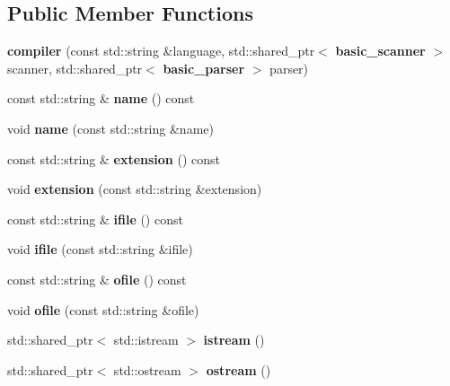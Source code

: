 \subsection*{Public Member Functions}
\begin{DoxyCompactItemize}
\item 
{\bfseries compiler} (const std\+::string \&language, std\+::shared\+\_\+ptr$<$ {\bf basic\+\_\+scanner} $>$ scanner, std\+::shared\+\_\+ptr$<$ {\bf basic\+\_\+parser} $>$ parser)\label{classcdk_1_1compiler_a0718890212e30c490d31158ea8d75f73}

\item 
const std\+::string \& {\bfseries name} () const \label{classcdk_1_1compiler_a15f8502422151ac34bcaaa78790cfa41}

\item 
void {\bfseries name} (const std\+::string \&name)\label{classcdk_1_1compiler_a933cbe2e866df6bcf976f3b2bca53873}

\item 
const std\+::string \& {\bfseries extension} () const \label{classcdk_1_1compiler_a5f94c7de284d1b6eea8a8f613b177830}

\item 
void {\bfseries extension} (const std\+::string \&extension)\label{classcdk_1_1compiler_a944e52a202d89b3ba19988eacdc617b2}

\item 
const std\+::string \& {\bfseries ifile} () const \label{classcdk_1_1compiler_a7477c2ec092266198bdecdedb198f2ed}

\item 
void {\bfseries ifile} (const std\+::string \&ifile)\label{classcdk_1_1compiler_ac7a952f66fed4125e3054b5c7592ddb1}

\item 
const std\+::string \& {\bfseries ofile} () const \label{classcdk_1_1compiler_a1b372fc1814ae74cd4dcb36aefb86705}

\item 
void {\bfseries ofile} (const std\+::string \&ofile)\label{classcdk_1_1compiler_a2077beaf9b1bc9d087830d609a397de5}

\item 
std\+::shared\+\_\+ptr$<$ std\+::istream $>$ {\bfseries istream} ()\label{classcdk_1_1compiler_ae7cf9a49176b0ab9239f0c4d2e5b1668}

\item 
std\+::shared\+\_\+ptr$<$ std\+::ostream $>$ {\bfseries ostream} ()\label{classcdk_1_1compiler_a36a108cb45b06e37eca6dfc4075784fa}


\end{DoxyCompactItemize}
